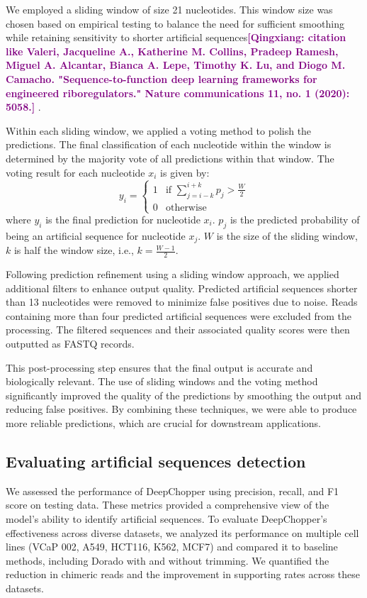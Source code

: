 \documentclass[pdflatex, sn-mathphys-num, lineno]{sn-jnl}%
\newcommand{\qx}[1]{\textcolor{purple}{\textbf{[Qingxiang: #1]}}}
\theoremstyle{thmstyleone}%
\theoremstyle{thmstyletwo}%
\theoremstyle{thmstylethree}%
\begin{document}
We employed a sliding window of size 21 nucleotides.
This window size was chosen based on empirical testing to balance the need for sufficient smoothing while retaining sensitivity to shorter artificial sequences\qx{citation like Valeri, Jacqueline A., Katherine M. Collins, Pradeep Ramesh, Miguel A. Alcantar, Bianca A. Lepe, Timothy K. Lu, and Diogo M. Camacho. "Sequence-to-function deep learning frameworks for engineered riboregulators." Nature communications 11, no. 1 (2020): 5058.} .

Within each sliding window, we applied a voting method to polish the predictions.
The final classification of each nucleotide within the window is determined by the majority vote of all predictions within that window.
The voting result for each nucleotide \( x_i \) is given by:
\[
	y_i = \begin{cases}
		1 & \text{if } \sum_{j=i-k}^{i+k} p_j > \frac{W}{2} \\
		0 & \text{otherwise}
	\end{cases}
\]
where \( y_i \) is the final prediction for nucleotide \( x_i \). \( p_j \) is the predicted probability of being an artificial sequence for nucleotide \( x_j \). \( W \) is the size of the sliding window, \( k \) is half the window size, i.e., \( k = \frac{W-1}{2} \).

Following prediction refinement using a sliding window approach, we applied additional filters to enhance output quality.
Predicted artificial sequences shorter than 13 nucleotides were removed to minimize false positives due to noise.
Reads containing more than four predicted artificial sequences were excluded from the processing.
The filtered sequences and their associated quality scores were then outputted as FASTQ records.

This post-processing step ensures that the final output is accurate and biologically relevant.
The use of sliding windows and the voting method significantly improved the quality of the predictions by smoothing the output and reducing false positives.
By combining these techniques, we were able to produce more reliable predictions, which are crucial for downstream applications.


\subsection{Evaluating artificial sequences detection}

We assessed the performance of DeepChopper using precision, recall, and F1 score on testing data.
These metrics provided a comprehensive view of the model's ability to identify artificial sequences.
To evaluate DeepChopper's effectiveness across diverse datasets, we analyzed its performance on multiple cell lines (VCaP 002, A549, HCT116, K562, MCF7) and compared it to baseline methods, including Dorado with and without trimming.
We quantified the reduction in chimeric reads and the improvement in supporting rates across these datasets.
\end{document}
